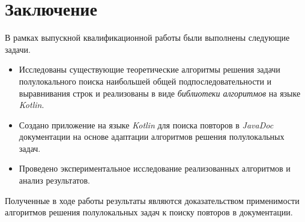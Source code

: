 \section*{Заключение}
В рамках выпускной квалификационной работы были выполнены следующие задачи.
\begin{itemize}
    \item Исследованы существующие теоретические алгоритмы решения задачи полулокального поиска наибольшей общей подпоследовательности и  выравнивания строк и реализованы в виде     \emph{библиотеки алгоритмов} на языке \emph{Kotlin}.
    \item Создано приложение на языке \emph{Kotlin} для поиска повторов в \emph{JavaDoc} документации на основе адаптации алгоритмов решения полулокальных задач.
    \item Проведено экспериментальное исследование реализованных алгоритмов  и  анализ результатов.
\end{itemize}

Полученные в ходе работы результаты являются доказательством применимости алгоритмов решения полулокальных задач к поиску повторов в документации. 


